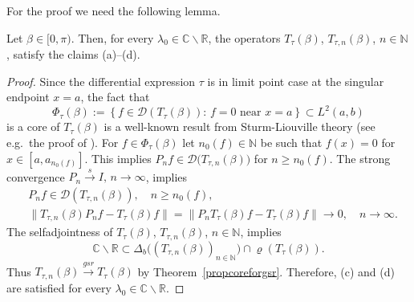 \documentclass[a4paper,reqno]{amsart}
\begin{document}
For the proof we need the following lemma.

\begin{lemma}\label{lemmaSL}
Let $\beta\in [0,\pi)$. Then, for every $\lambda_0\in{\mathbb{C}}\backslash{\mathbb{R}}$, the operators $T_{\tau}(\beta)$, $T_{\tau,n}(\beta)$, $n\in{\mathbb{N}}$, satisfy the claims  {\rm (a)--(d)}.
\end{lemma}

\begin{proof}
Since the differential expression $\tau$ is in limit point case at the singular endpoint $x=a$, 
the fact that 
$$\Phi_{\tau}(\beta):=\left\{f\in{\mathcal D}(T_{\tau}(\beta)):\,f=0 \text{ near } x=a\right\}\subset L^2(a,b)$$ 
 is a core of $T_{\tau}(\beta)$ is a well-known result from Sturm-Liouville theory (see e.g.\ the proof of \cite[Satz~14.12]{weid2}). 
For $f\in\Phi_{\tau}(\beta)$ let $n_0(f)\in{\mathbb{N}}$ be such that $f(x)=0$ for $x\in[a,a_{n_0(f)}]$. This implies $P_nf\in{\mathcal D}\big(T_{\tau,n}(\beta)\big)$ for $n\geq n_0(f)$.
The strong convergence $P_n{\stackrel{s}{\rightarrow}} I, \,n\to\infty$, implies
\begin{equation} \label{convforeachxinPhi}
\begin{aligned}
&P_nf\in{\mathcal D}(T_{\tau,n}(\beta)), \quad n\geq n_0(f),  \\[1mm]
&\big\|T_{\tau,n}(\beta)P_nf-T_{\tau}(\beta)f\big\|
=\big\|P_nT_{\tau}(\beta)f-T_{\tau}(\beta)f\big\|{\longrightarrow} 0, \quad n\to\infty.
\end{aligned}
\end{equation}
The selfadjointness of $T_{\tau}(\beta)$, $T_{\tau,n}(\beta)$, $n\in{\mathbb{N}}$, implies 
\begin{equation}\label{eq.nonrealinDeltab}
{\mathbb{C}}\backslash{\mathbb{R}}\subset\Delta_b\big((T_{\tau,n}(\beta))_{n\in{\mathbb{N}}}\big)\cap\varrho(T_{\tau}(\beta)).
\end{equation}
Thus $T_{\tau,n}(\beta){\stackrel{gsr}{\rightarrow}} T_{\tau}(\beta)$ by Theorem~\ref{propcoreforgsr}. Therefore, (c) and (d) are satisfied for every $\lambda_0\in{\mathbb{C}}\backslash{\mathbb{R}}$.


\end{proof}
\end{document}
